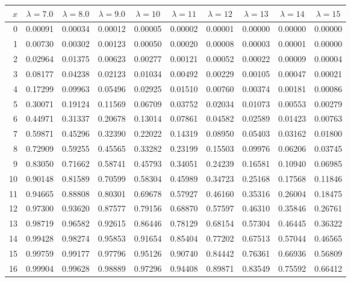 \myskip
\begin{tabular}{r|*{9}{c}}
$x$ &  $\lambda=7.0$  &  $\lambda=8.0$  &  $\lambda=9.0$  &  $\lambda=10$  &  $\lambda=11$  
    &  $\lambda=12$  &  $\lambda=13$  &  $\lambda=14$  &  $\lambda=15$                    \\\hline
  0 & 0.00091 & 0.00034 & 0.00012 & 0.00005 & 0.00002 & 0.00001 & 0.00000 & 0.00000 & 0.00000 \\
  1 & 0.00730 & 0.00302 & 0.00123 & 0.00050 & 0.00020 & 0.00008 & 0.00003 & 0.00001 & 0.00000 \\
  2 & 0.02964 & 0.01375 & 0.00623 & 0.00277 & 0.00121 & 0.00052 & 0.00022 & 0.00009 & 0.00004 \\
  3 & 0.08177 & 0.04238 & 0.02123 & 0.01034 & 0.00492 & 0.00229 & 0.00105 & 0.00047 & 0.00021 \\
  4 & 0.17299 & 0.09963 & 0.05496 & 0.02925 & 0.01510 & 0.00760 & 0.00374 & 0.00181 & 0.00086 \\
  5 & 0.30071 & 0.19124 & 0.11569 & 0.06709 & 0.03752 & 0.02034 & 0.01073 & 0.00553 & 0.00279 \\
  6 & 0.44971 & 0.31337 & 0.20678 & 0.13014 & 0.07861 & 0.04582 & 0.02589 & 0.01423 & 0.00763 \\
  7 & 0.59871 & 0.45296 & 0.32390 & 0.22022 & 0.14319 & 0.08950 & 0.05403 & 0.03162 & 0.01800 \\
  8 & 0.72909 & 0.59255 & 0.45565 & 0.33282 & 0.23199 & 0.15503 & 0.09976 & 0.06206 & 0.03745 \\
  9 & 0.83050 & 0.71662 & 0.58741 & 0.45793 & 0.34051 & 0.24239 & 0.16581 & 0.10940 & 0.06985 \\
 10 & 0.90148 & 0.81589 & 0.70599 & 0.58304 & 0.45989 & 0.34723 & 0.25168 & 0.17568 & 0.11846 \\
 11 & 0.94665 & 0.88808 & 0.80301 & 0.69678 & 0.57927 & 0.46160 & 0.35316 & 0.26004 & 0.18475 \\
 12 & 0.97300 & 0.93620 & 0.87577 & 0.79156 & 0.68870 & 0.57597 & 0.46310 & 0.35846 & 0.26761 \\
 13 & 0.98719 & 0.96582 & 0.92615 & 0.86446 & 0.78129 & 0.68154 & 0.57304 & 0.46445 & 0.36322 \\
 14 & 0.99428 & 0.98274 & 0.95853 & 0.91654 & 0.85404 & 0.77202 & 0.67513 & 0.57044 & 0.46565 \\
 15 & 0.99759 & 0.99177 & 0.97796 & 0.95126 & 0.90740 & 0.84442 & 0.76361 & 0.66936 & 0.56809 \\
 16 & 0.99904 & 0.99628 & 0.98889 & 0.97296 & 0.94408 & 0.89871 & 0.83549 & 0.75592 & 0.66412 \\

\end{tabular}
